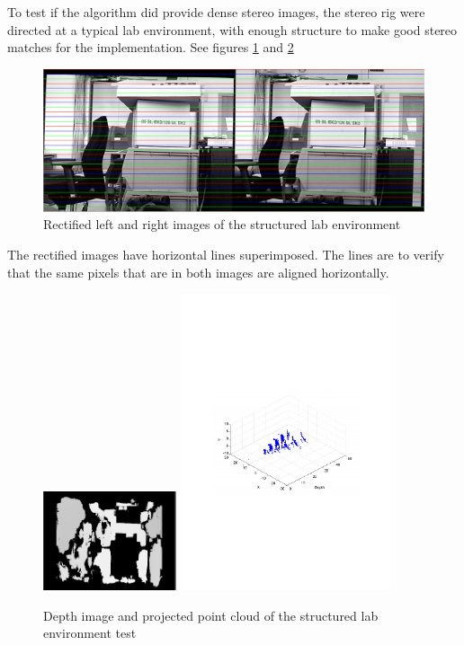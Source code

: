 To test if the algorithm did provide dense stereo images, the stereo rig were directed at
a typical lab environment, with enough structure to make good stereo matches for the
implementation. See figures \ref{chap8:fig-structured-test-rectified} and
\ref{chap8:fig-structured-test-depth}
\begin{figure}[htbp]
    \centering
    \includegraphics[width=\textwidth]{pics/structure-test-rectified}
    \caption{Rectified left and right images of the structured lab environment}
    \label{chap8:fig-structured-test-rectified}
\end{figure}
The rectified images have horizontal lines superimposed. The lines are to verify that the same
pixels that are in both images are aligned horizontally.
\begin{figure}[htbp]
    \centering
    \includegraphics[width=0.35\textwidth]{pics/structure-test-depth}
    \includegraphics[width=0.55\textwidth]{pics/structured-test3d}
    \caption{Depth image and projected point cloud of the structured lab environment test}
    \label{chap8:fig-structured-test-depth}
\end{figure}
